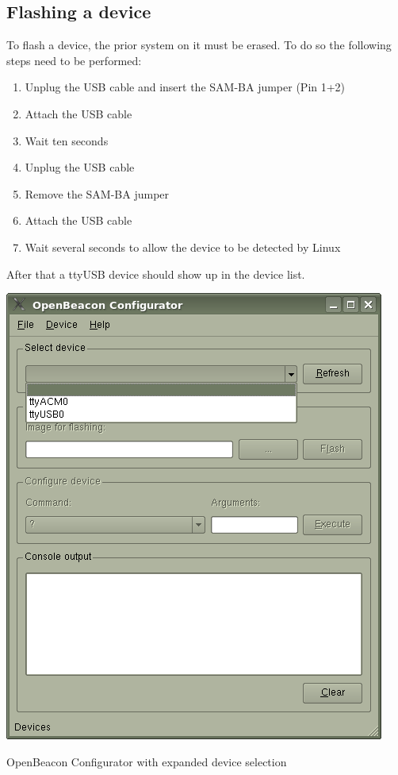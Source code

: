   \subsection{Flashing a device}
  \label{sec:userManual:obConfig:flashingADevice}
   To flash a device, the prior system on it must be erased. To do so the following steps need to be performed:
   \begin{enumerate}
    \item Unplug the USB cable and insert the SAM-BA jumper (Pin 1+2)
    \item Attach the USB cable
    \item Wait ten seconds
    \item Unplug the USB cable
    \item Remove the SAM-BA jumper
    \item Attach the USB cable
    \item Wait several seconds to allow the device to be detected by Linux
   \end{enumerate}
   After that a ttyUSB device should show up in the device list.
   \begin{staticFigure}
    \begin{center}
     \includegraphics{images/UserManual/obConfig/mainWindow-deviceSelection.png}
     \caption{OpenBeacon Configurator with expanded device selection}
     \label{fg:userManual:obConfig:mainWindow-deviceSelection}
    \end{center}
   \end{staticFigure}
